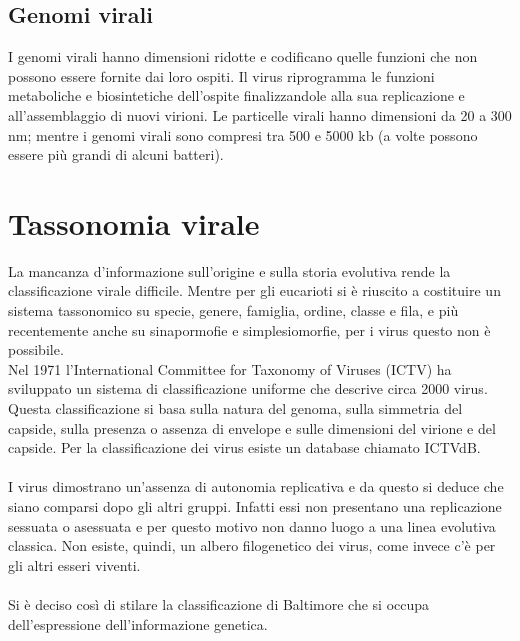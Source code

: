 \subsection{Genomi virali}
I genomi virali hanno dimensioni ridotte e codificano quelle funzioni che non possono essere fornite dai loro ospiti. Il virus riprogramma le funzioni metaboliche e biosintetiche dell'ospite finalizzandole alla sua replicazione e all'assemblaggio di nuovi virioni. Le particelle virali hanno dimensioni da 20 a 300 nm; mentre i genomi virali sono compresi tra 500 e 5000 kb (a volte possono essere pi\`u grandi di alcuni batteri).
\section{Tassonomia virale}
La mancanza d'informazione sull'origine e sulla storia evolutiva rende la classificazione virale difficile. Mentre per gli eucarioti si \`e riuscito a costituire un sistema tassonomico su specie, genere, famiglia, ordine, classe e fila, e pi\`u recentemente anche su sinapormofie e simplesiomorfie, per i virus questo non \`e possibile.
\\Nel 1971 l'International Committee for Taxonomy of Viruses (ICTV) ha sviluppato un sistema di classificazione uniforme che descrive circa 2000 virus. Questa classificazione si basa sulla natura del genoma, sulla simmetria del capside, sulla presenza o assenza di envelope e sulle dimensioni del virione e del capside. Per la classificazione dei virus esiste un database chiamato ICTVdB.
\\\\I virus dimostrano un'assenza di autonomia replicativa e da questo si deduce che siano comparsi dopo gli altri gruppi. Infatti essi non presentano una replicazione sessuata o asessuata e per questo motivo non danno luogo a una linea evolutiva classica. Non esiste, quindi, un albero filogenetico dei virus, come invece c'\`e per gli altri esseri viventi. 
\\\\Si \`e deciso cos\`i di stilare la classificazione di Baltimore che si occupa dell'espressione dell'informazione genetica. 

